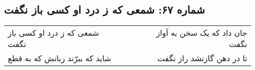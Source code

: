 \begin{center}
\section*{شماره ۶۷: شمعی که ز درد او کسی باز نگفت}
\label{sec:067}
\begin{longtable}{l p{0.5cm} r}
شمعی که ز درد او کسی باز نگفت
&&
جان داد که یک سخن به آواز نگفت
\\
شاید که ببرّند زبانش که به قطع
&&
تا در دهن گازنشد راز نگفت
\\
\end{longtable}
\end{center}
